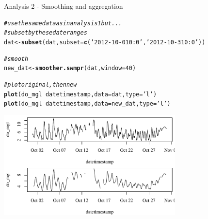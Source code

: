 \documentclass[xcolor=svgnames]{beamer}\usepackage[]{graphicx}\usepackage[]{color}
\makeatletter
\newcommand{\hlnum}[1]{\textcolor[rgb]{0.686,0.059,0.569}{#1}}%
\newcommand{\hlstr}[1]{\textcolor[rgb]{0.192,0.494,0.8}{#1}}%
\newcommand{\hlcom}[1]{\textcolor[rgb]{0.678,0.584,0.686}{\textit{#1}}}%
\newcommand{\hlopt}[1]{\textcolor[rgb]{0,0,0}{#1}}%
\newcommand{\hlstd}[1]{\textcolor[rgb]{0.345,0.345,0.345}{#1}}%
\newcommand{\hlkwb}[1]{\textcolor[rgb]{0.69,0.353,0.396}{#1}}%
\newcommand{\hlkwc}[1]{\textcolor[rgb]{0.333,0.667,0.333}{#1}}%
\newcommand{\hlkwd}[1]{\textcolor[rgb]{0.737,0.353,0.396}{\textbf{#1}}}%
\newenvironment{kframe}{%
 \def\at@end@of@kframe{}%
 \ifinner\ifhmode%
  \def\at@end@of@kframe{\end{minipage}}%
  \begin{minipage}{\columnwidth}%
 \fi\fi%
 \def\FrameCommand##1{\hskip\@totalleftmargin \hskip-\fboxsep
 \colorbox{shadecolor}{##1}\hskip-\fboxsep
     \hskip-\linewidth \hskip-\@totalleftmargin \hskip\columnwidth}%
 \MakeFramed {\advance\hsize-\width
   \@totalleftmargin\z@ \linewidth\hsize
   \@setminipage}}%
 {\par\unskip\endMakeFramed%
 \at@end@of@kframe}
\newenvironment{knitrout}{}{} %
\makeatother
\begin{document}
\begin{frame}[containsverbatim]{Analysis 2 - Smoothing and aggregation}
\begin{knitrout}\scriptsize
{}\color{fgcolor}\begin{kframe}
\begin{alltt}
\hlcom{# use the same data as in analysis 1 but...}
\hlcom{# subset by these date ranges}
\hlstd{dat} \hlkwb{<-} \hlkwd{subset}\hlstd{(dat,} \hlkwc{subset} \hlstd{=} \hlkwd{c}\hlstd{(}\hlstr{'2012-10-01 0:0'}\hlstd{,} \hlstr{'2012-10-31 0:0'}\hlstd{))}

\hlcom{# smooth }
\hlstd{new_dat} \hlkwb{<-} \hlkwd{smoother.swmpr}\hlstd{(dat,} \hlkwc{window} \hlstd{=} \hlnum{40}\hlstd{)}

\hlcom{# plot original, then new}
\hlkwd{plot}\hlstd{(do_mgl} \hlopt{~} \hlstd{datetimestamp,} \hlkwc{data} \hlstd{= dat,} \hlkwc{type} \hlstd{=} \hlstr{'l'}\hlstd{)}
\hlkwd{plot}\hlstd{(do_mgl} \hlopt{~} \hlstd{datetimestamp,} \hlkwc{data} \hlstd{= new_dat,} \hlkwc{type} \hlstd{=} \hlstr{'l'}\hlstd{)}
\end{alltt}
\end{kframe}
\end{knitrout}
\begin{knitrout}\scriptsize
{}\color{fgcolor}

{\centering \includegraphics[width=0.7\textwidth]{figure/unnamed-chunk-10} 

}



\end{knitrout}
\end{frame}
\end{document}
